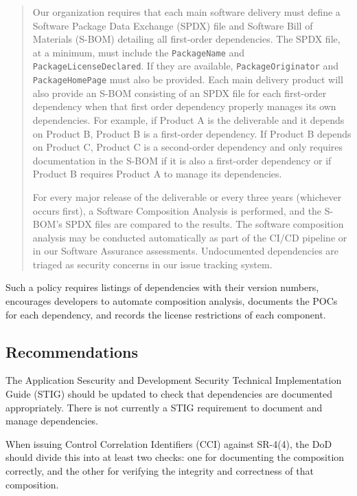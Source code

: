 \begin{quote}
Our organization requires that each main software delivery must define a Software Package Data Exchange (SPDX) file and Software Bill of Materials (S-BOM) detailing all first-order dependencies.\autocite{20210705:wheeler2019} The SPDX file, at a minimum, must include the \texttt{PackageName} and \texttt{PackageLicenseDeclared}. If they are available, \texttt{PackageOriginator} and \texttt{PackageHomePage} must also be provided. Each main delivery product will also provide an S-BOM consisting of an SPDX file for each first-order dependency when that first order dependency properly manages its own dependencies. For example, if Product A is the deliverable and it depends on Product B, Product B is a first-order dependency. If Product B depends on Product C, Product C is a second-order dependency and only requires documentation in the S-BOM if it is also a first-order dependency or if Product B requires Product A to manage its dependencies.

For every major release of the deliverable or every three years (whichever occurs first), a Software Composition Analysis is performed, and the S-BOM's SPDX files are compared to the results. The software composition analysis may be conducted automatically as part of the CI/CD pipeline or in our Software Assurance assessments. Undocumented dependencies are triaged as security concerns in our issue tracking system.
\end{quote}

Such a policy requires listings of dependencies with their version numbers, encourages developers to automate composition analysis, documents the POCs for each dependency, and records the license restrictions of each component.

\subsection{Recommendations}

The Application Sescurity and Development Security Technical Implementation Guide (STIG) should be updated to check that dependencies are documented appropriately. There is not currently a STIG requirement to document and manage dependencies.

When issuing Control Correlation Identifiers (CCI) against SR-4(4), the DoD should divide this into at least two checks: one for documenting the composition correctly, and the other for verifying the integrity and correctness of that composition.
